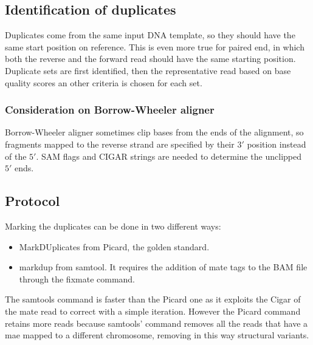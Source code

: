 	\subsection{Identification of duplicates}
	Duplicates come from the same input DNA template, so they should have the same start position on reference.
	This is even more true for paired end, in which both the reverse and the forward read should have the same starting position.
	Duplicate sets are first identified, then the representative read based on base quality scores an other criteria is chosen for each set.

		\subsubsection{Consideration on Borrow-Wheeler aligner}
		Borrow-Wheeler aligner sometimes clip bases from the ends of the alignment, so fragments mapped to the reverse strand are specified by their $3'$ position instead of the $5'$.
		SAM flags and CIGAR strings are needed to determine the unclipped $5'$ ends.

	\subsection{Protocol}
	Marking the duplicates can be done in two different ways:

	\begin{multicols}{2}
		\begin{itemize}
			\item MarkDUplicates from Picard, the golden standard.
			\item markdup from samtool.
				It requires the addition of mate tags to the BAM file through the fixmate command.
		\end{itemize}
	\end{multicols}

	The samtools command is faster than the Picard one as it exploits the Cigar of the mate read to correct with a simple iteration.
	However the Picard command retains more reads because samtools' command removes all the reads that have a mae mapped to a different chromosome, removing in this way structural variants.
